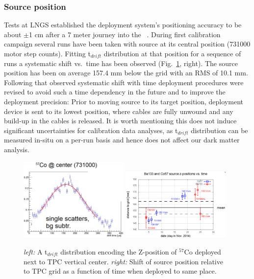 \subsubsection{Source position}
Tests at LNGS established the deployment system's positioning accuracy to be about $\pm$1 cm after a 7 meter journey into the \dsf\ \lsv.
During first calibration campaign several runs have been taken with source at its central position (731000 motor step counts). Fitting t$_{drift}$ distribution at that position for a sequence of runs a systematic shift vs.~time has been observed (Fig.~\ref{fig:SourcePosition}, right). The source position has been on average 157.4 mm below the grid with an RMS of 10.1 mm. Following that observed systematic shift with time deployment procedures were revised to avoid such a time dependency in the future and to improve the deployment precision: Prior to moving source to its target position, deployment device is sent to its lowest position, where cables are fully unwound and any build-up in the cables is released. It is worth mentioning this does not induce significant uncertainties for calibration data analyses, as t$_{drift}$ distribution can be measured in-situ on a per-run basis and hence does not affect our dark matter analysis.
\begin{figure}[htbp]
\centering
\includegraphics[width=0.48\textwidth]{./Figures/Tdrift_distribution_Co57_DocDB1288.png}
\includegraphics[width=0.48\textwidth]{./Figures/SourcePosition_vs_time_DocDB1288.png}
\caption{\textit{left:} A t$_{drift}$ distribution encoding the Z-position of $^{57}$Co deployed next to TPC vertical center.
\textit{right:} Shift of source position relative to TPC grid as a function of time when deployed to same place.
\label{fig:SourcePosition}} 
\end{figure}

